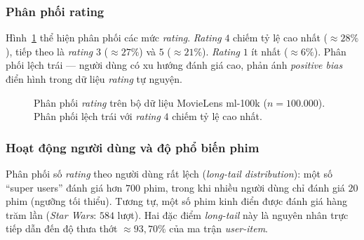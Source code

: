 \documentclass[../BTL.tex]{subfiles}
\begin{document}
\subsubsection*{Phân phối rating}

Hình~\ref{fig:rating_dist} thể hiện phân phối các mức \textit{rating}.
\textit{Rating} $4$ chiếm tỷ lệ cao nhất (${\approx}28\%$), tiếp theo là
\textit{rating} $3$ (${\approx}27\%$) và $5$ (${\approx}21\%$).
\textit{Rating} $1$ ít nhất (${\approx}6\%$). Phân phối lệch trái — người
dùng có xu hướng đánh giá cao, phản ánh \textit{positive bias} điển hình
trong dữ liệu \textit{rating} tự nguyện.

\begin{figure}[H]
\centering
{}
\caption{Phân phối \textit{rating} trên bộ dữ liệu MovieLens ml-100k
($n = 100.000$). Phân phối lệch trái với \textit{rating} $4$ chiếm tỷ lệ
cao nhất.}
\label{fig:rating_dist}
\end{figure}

\subsubsection*{Hoạt động người dùng và độ phổ biến phim}

Phân phối số \textit{rating} theo người dùng rất lệch
(\textit{long-tail distribution}): một số ``super users'' đánh giá hơn $700$
phim, trong khi nhiều người dùng chỉ đánh giá $20$ phim (ngưỡng tối thiểu).
Tương tự, một số phim kinh điển được đánh giá hàng trăm lần
(\textit{Star Wars}: $584$ lượt). Hai đặc điểm \textit{long-tail} này là
nguyên nhân trực tiếp dẫn đến độ thưa thớt ${\approx}93{,}70\%$ của ma trận
\textit{user-item}.
\end{document}
